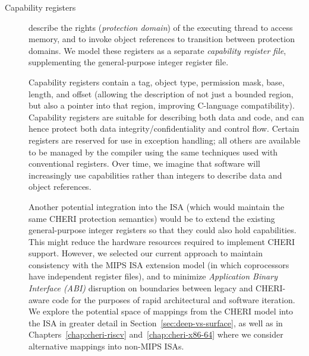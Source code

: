 \begin{description}
\item[Capability registers] describe the rights ({\em protection domain}) of
the executing thread to
access memory, and to invoke object references
to transition between protection domains.
We model these registers as a separate {\em capability register file},
supplementing the general-purpose integer register file.

Capability registers contain a tag, object type, permission mask, base, length, and offset (allowing the description of not just a bounded region, but also a pointer into that region, improving C-language compatibility).
Capability registers are suitable for describing both data and code, and can hence protect both data integrity/confidentiality and control flow.
Certain registers are reserved for use in exception handling; all others are available to be managed by the compiler using the same techniques used with conventional registers.
Over time, we imagine that software will increasingly use capabilities rather
than integers to describe data and object references.

Another potential integration into the ISA (which would maintain the same
CHERI protection semantics) would be to extend the existing general-purpose
integer registers so that they could also hold capabilities.
This might reduce the hardware resources required to implement CHERI support.
However, we selected our current approach to maintain consistency with the
MIPS ISA extension model (in which coprocessors have independent register
files), and to minimize \textit{Application Binary Interface (ABI)} disruption
on boundaries between legacy and CHERI-aware code for the purposes of rapid
architectural and software iteration.
We explore the potential space of mappings from the CHERI model into the ISA
in greater detail in Section~\ref{sec:deep-vs-surface}, as well as in
Chapters~\ref{chap:cheri-riscv} and~\ref{chap:cheri-x86-64} where we consider
alternative mappings into non-MIPS ISAs.


\end{description}
